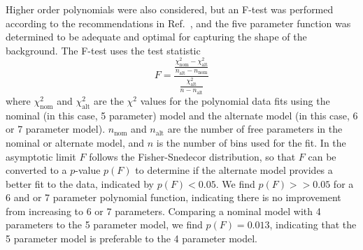Higher order polynomials were also considered, but an F-test was performed according to the recommendations in Ref.~\cite{smooth_bkg}, and the five parameter function was determined to be adequate and optimal for capturing the shape of the background.
The F-test uses the test statistic 
\begin{equation}
F = \frac{\frac{\chi_{\text{nom}}^2 - \chi_{\text{alt}}^2}{n_\text{alt} - n_\text{nom}}}{\frac{ \chi_{\text{alt}}^2}{n-n_\text{alt} }}
\end{equation}
where $\chi_{\text{nom}}^2$ and $\chi_{\text{alt}}^2$ are the $\chi^2$ values for the polynomial data fits using the nominal (in this case, 5 parameter) model and the alternate model (in this case, 6 or 7 parameter model).
$n_\text{nom}$ and $n_\text{alt}$ are the number of free parameters in the nominal or alternate model, and $n$ is the number of bins used for the fit.
In the asymptotic limit $F$ follows the Fisher-Snedecor distribution, so that $F$ can be converted to a $p$-value $p(F)$ to determine if the alternate model provides a better fit to the data, indicated by $p(F) < 0.05$.
We find $p(F) >> 0.05$ for a 6 and or 7 parameter polynomial function, indicating there is no improvement from increasing to 6 or 7 parameters.
Comparing a nominal model with 4 parameters to the 5 parameter model, we find $p(F) = 0.013$, indicating that the 5 parameter model is preferable to the 4 parameter model.





